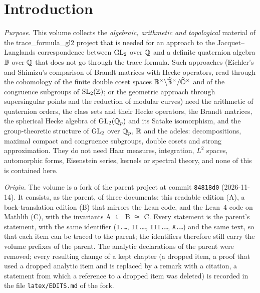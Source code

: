 \chapter*{Introduction}\label{ch:intro}

\noindent\emph{Purpose.} This volume collects the \emph{algebraic, arithmetic and topological} material of the
trace\_formula\_gl2 project that is needed for an approach to the Jacquet--Langlands correspondence between
$\mathrm{GL}_2$ over $\mathbb{Q}$ and a definite quaternion algebra $\mathbb{B}$ over $\mathbb{Q}$ that does not go through the trace formula.
Such approaches (Eichler's and Shimizu's comparison of Brandt matrices with Hecke operators, read through the
cohomology of the finite double coset spaces $\mathbb{B}^\times\backslash\widehat{\mathbb{B}}^\times/\widehat{\mathbb{O}}^\times$ and of the
congruence subgroups of $\mathrm{SL}_2(\mathbb{Z})$; or the geometric approach through supersingular points and the reduction of
modular curves) need the arithmetic of quaternion orders, the class sets and their Hecke operators, the Brandt
matrices, the spherical Hecke algebra of $\mathrm{GL}_2(\mathbb{Q}_p)$ and its Satake isomorphism, and the group-theoretic
structure of $\mathrm{GL}_2$ over $\mathbb{Q}_p$, $\mathbb{R}$ and the adeles: decompositions, maximal compact and congruence subgroups,
double cosets and strong approximation. They do not need Haar measures, integration, $L^2$ spaces, automorphic
forms, Eisenstein series, kernels or spectral theory, and none of this is contained here.

\noindent\emph{Origin.} The volume is a fork of the parent project at commit \texttt{84818d0} (2026-11-14). It
consists, as the parent, of three documents: this readable edition (A), a back-translation edition (B) that mirrors
the Lean code, and the Lean~4 code on Mathlib (C), with the invariants A $\subseteq$ B $\cong$ C. Every statement is
the parent's statement, with the same identifier (\texttt{I.\dots}, \texttt{II.\dots}, \texttt{III.\dots},
\texttt{X.\dots}) and the same text, so that each item can be traced to the parent; the identifiers therefore still
carry the volume prefixes of the parent. The analytic declarations of the parent were removed; every resulting
change of a kept chapter (a dropped item, a proof that used a dropped analytic item and is replaced by a remark
with a citation, a statement from which a reference to a dropped item was deleted) is recorded in the file
\texttt{latex/EDITS.md} of the fork.

